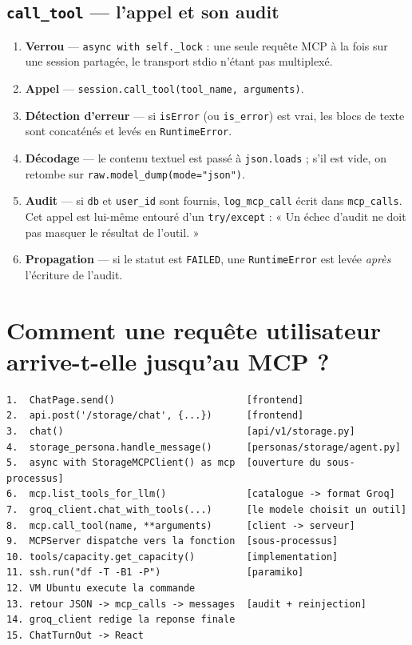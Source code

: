 \documentclass[11pt,a4paper]{report}
\newcommand{\fn}[1]{\texttt{\small\textcolor{oasisviolet}{#1}}}
\newcommand{\cls}[1]{\texttt{\small\textcolor{oasisblue}{#1}}}
\newcommand{\tbl}[1]{\texttt{\small\textcolor{oasisamber}{#1}}}
\begin{document}
\subsection*{\fn{call\_tool} --- l'appel et son audit}

\begin{enumerate}
  \item \textbf{Verrou} --- \texttt{async with self.\_lock} : une seule requête
  MCP à la fois sur une session partagée, le transport stdio n'étant pas
  multiplexé.
  \item \textbf{Appel} --- \fn{session.call\_tool(tool\_name, arguments)}.
  \item \textbf{Détection d'erreur} --- si \texttt{isError} (ou
  \texttt{is\_error}) est vrai, les blocs de texte sont concaténés et levés en
  \cls{RuntimeError}.
  \item \textbf{Décodage} --- le contenu textuel est passé à
  \texttt{json.loads} ; s'il est vide, on retombe sur
  \texttt{raw.model\_dump(mode="json")}.
  \item \textbf{Audit} --- si \texttt{db} et \texttt{user\_id} sont fournis,
  \fn{log\_mcp\_call} écrit dans \tbl{mcp\_calls}. Cet appel est lui-même
  entouré d'un \texttt{try/except} : « Un échec d'audit ne doit pas masquer le
  résultat de l'outil. »
  \item \textbf{Propagation} --- si le statut est \texttt{FAILED}, une
  \cls{RuntimeError} est levée \emph{après} l'écriture de l'audit.
\end{enumerate}

\section{Comment une requête utilisateur arrive-t-elle jusqu'au MCP ?}

\begin{lstlisting}[caption={Trajet complet, fonction par fonction}]
1.  ChatPage.send()                       [frontend]
2.  api.post('/storage/chat', {...})      [frontend]
3.  chat()                                [api/v1/storage.py]
4.  storage_persona.handle_message()      [personas/storage/agent.py]
5.  async with StorageMCPClient() as mcp  [ouverture du sous-processus]
6.  mcp.list_tools_for_llm()              [catalogue -> format Groq]
7.  groq_client.chat_with_tools(...)      [le modele choisit un outil]
8.  mcp.call_tool(name, **arguments)      [client -> serveur]
9.  MCPServer dispatche vers la fonction  [sous-processus]
10. tools/capacity.get_capacity()         [implementation]
11. ssh.run("df -T -B1 -P")               [paramiko]
12. VM Ubuntu execute la commande
13. retour JSON -> mcp_calls -> messages  [audit + reinjection]
14. groq_client redige la reponse finale
15. ChatTurnOut -> React
\end{lstlisting}
\end{document}
